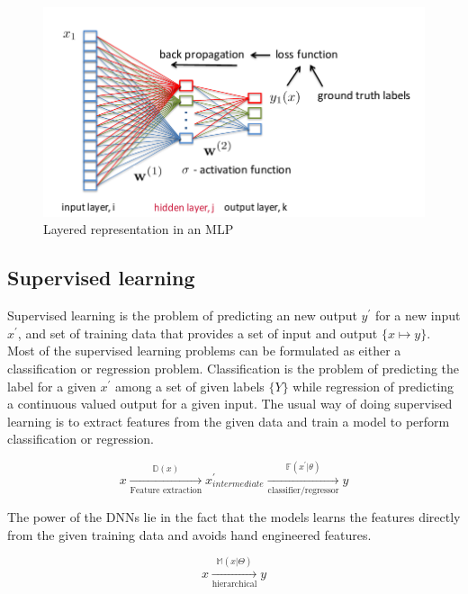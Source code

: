 \documentclass[a4paper]{article}
\begin{document}
\begin{figure}
  \includegraphics[width=.99\linewidth]{img/mlp.png}
  \caption{Layered representation in an MLP}
  \label{fig:mlp}
\end{figure}


\subsection{Supervised  learning}   Supervised  learning   is   the  problem  of
predicting an new output $y^\prime$ for a new  input $x^\prime$,
and set of training  data that provides a  set of  input and output $\{x \mapsto
y\}$. Most of the supervised learning problems  can be  formulated  as either  a
classification   or  regression   problem.  Classification  is  the  problem  of
predicting the  label for a given $x^\prime$ among a set of given labels
$\{Y\}$  while regression  of predicting a continuous valued output for  a given
input. The usual way  of  doing supervised learning  is to extract features from
the given data and train a model to perform classification or regression.


\begin{equation*}
  x
  \xrightarrow[\text{Feature extraction}]{
    \mathbb{D}(x)
  }
  x^\prime
  _{intermediate}
  \xrightarrow[\text{classifier/regressor}]{
    \mathbb{F}(x^\prime | \theta)
  }
  y
\end{equation*}


The  power of the  DNNs lie in  the fact  that the  models learns  the  features
directly from the given training data and avoids hand  engineered features.


\begin{equation*}
  x \xrightarrow[ \text{hierarchical}] { \mathbb{M}(x | \Theta) } y
\end{equation*}
\end{document}
